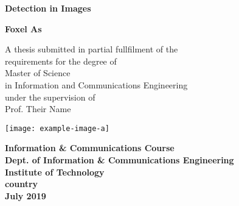 \begin{titlepage}
    \begin{center}
        \vspace*{1cm}
 
        \Huge
        \textbf{Detection in Images}
 
        \vspace{1.5cm}
        
		\Large
        \textbf{Foxel As}
  
        \vspace{0.8cm}

		\begin{normalsize}
        A thesis submitted in partial fullfilment of the\\
        requirements for the degree of\\
        Master of Science \\
        in Information and Communications Engineering\\
        \vspace{0.5cm}
        under the supervision of \\
        Prof. Their Name \\
		\end{normalsize}
        
        \vfill
 		\vspace{0.8cm}

        \texttt{[image: example-image-a]} %
        
        \vspace{0.8cm}

        \large
		\textbf{        
		Information \& Communications Course\\
        Dept. of Information \& Communications Engineering\\
        Institute of Technology\\
        country\\
        \vspace{0.5cm}
        July 2019
        }
 
    \end{center}
\end{titlepage}